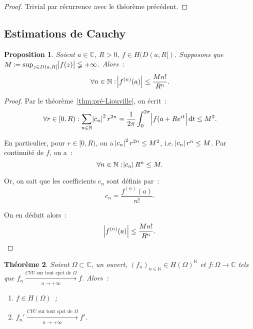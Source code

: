 \documentclass{report}
\newtheorem{thm}{Théorème}[chapter]
\newtheorem{prp}[thm]{Proposition}
\theoremstyle{definition}
\theoremstyle{remark}
\numberwithin{equation}{section}
\newcommand{\C}{\mathbb C}
\newcommand{\N}{\mathbb N}
\newcommand{\CONV}[5]{\xrightarrow[#2 \to #3]{#4 \text{ #5 } #1}}
\newcommand{\CVUc}[3]{\CONV{#1}{#2}{#3}{CVU}{sur tout cpct de}}
\newcommand{\pinfty}{{+\infty}}
\begin{document}
			\begin{proof} Trivial par récurrence avec le théorème précédent.
			\end{proof}

		\subsection{Estimations de Cauchy}
			\begin{prp} Soient $a \in \C$, $R > 0$, $f \in H(D(a, R[)$. Supposons que $M \coloneqq \sup_{z \in D(a, R[}\abs {f(z)} \lneqq \pinfty$. Alors~:
			\begin{equation}
				\forall n \in \N : \abs {f^{(n)}(a)} \leq \frac {Mn!}{R^n}.
			\end{equation}
			\end{prp}

			\begin{proof} Par le théorème~\ref{thm:pré-Liouville}, on écrit~:
			\begin{equation}
				\forall r \in [0, R) : \sum_{n \in \N}\abs {c_n}^2r^{2n} = \frac 1{2\pi}\int_0^{2\pi}\abs {f(a+Re^{it}}\dif t \leq M^2.
			\end{equation}

			En particulier, pour $r \in [0, R)$, on a $\abs {c_n}^2r^{2n} \leq M^2$, i.e. $\abs {c_n}r^n \leq M$. Par continuité de $f$, on a~:
			\begin{equation}
				\forall n \in \N : \abs {c_n}R^n \leq M.
			\end{equation}

			Or, on sait que les coefficients $c_n$ sont définis par~:
			\begin{equation}
				c_n = \frac {f^{(n)}(a)}{n!}.
			\end{equation}

			On en déduit alors~:
			\begin{equation}
				\abs {f^{(n)}(a)} \leq \frac {Mn!}{R^n}.
			\end{equation}
			\end{proof}

			\begin{thm} Soient $\Omega \subset \C$, un ouvert, $(f_n)_{n \in \N} \in H(\Omega)^\N$ et $f : \Omega \to \C$ tels que
			$f_n \CVUc \Omega n\pinfty f$. Alors~:
			\begin{enumerate}
				\item $f \in H(\Omega)$~;
				\item $f_n' \CVUc \Omega n\pinfty f'$.
			\end{enumerate}
			\end{thm}
\end{document}
